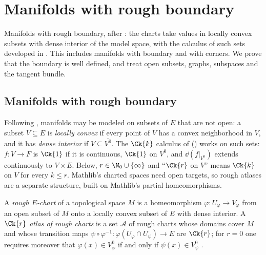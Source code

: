 \chapter{Manifolds with rough boundary}
\label{chap:roughboundary}

Manifolds with rough boundary, after \cite[\S3.5]{GN26}: the charts take values in locally
convex subsets with dense interior of the model space, with the calculus of such sets developed
in \cite{LCA}. This includes manifolds with boundary and with corners. We prove that the boundary
is well defined, and treat open subsets, graphs, subspaces and the tangent bundle.

\section{Manifolds with rough boundary}
\label{sec:rough-boundary}

Following \cite[\S3.5]{GN26}, manifolds may be modeled on subsets of $E$ that are not open: a
subset $V \subseteq E$ is \emph{locally convex} if every point of $V$ has a convex neighborhood
in $V$, and it has \emph{dense interior} if $V \subseteq \overline{V^0}$. The $\Ck{k}$ calculus
of \cite{LCA} (\cite[\S1.4]{GN26}) works on such sets: $f\colon V \to F$ is $\Ck{1}$ if it is
continuous, $\Ck{1}$ on $V^0$, and $\dd(f|_{V^0})$ extends continuously to $V \times E$. Below,
$r \in \N_0 \cup \{\infty\}$ and ``$\Ck{r}$ on $V$'' means $\Ck{k}$ on $V$ for every $k \le r$.
Mathlib's charted spaces need open targets, so rough atlases are a separate structure, built on
Mathlib's partial homeomorphisms.

\begin{definition}
  \label{def:rough-atlas}
  \leanok
  A \emph{rough $E$-chart} of a topological space $M$ is a homeomorphism
  $\varphi\colon U_\varphi \to V_\varphi$ from an open subset of $M$ onto a locally convex subset
  of $E$ with dense interior. A \emph{$\Ck{r}$ atlas of rough charts} is a set $\mathcal{A}$ of
  rough charts whose domains cover $M$ and whose transition maps
  $\psi \circ \varphi^{-1}\colon \varphi(U_\varphi \cap U_\psi) \to E$ are $\Ck{r}$; for $r = 0$
  one requires moreover that $\varphi(x) \in V_\varphi^0$ if and only if $\psi(x) \in V_\psi^0$
  \cite[Definition 3.5.1(a), p.~278]{GN26}.
\end{definition}

